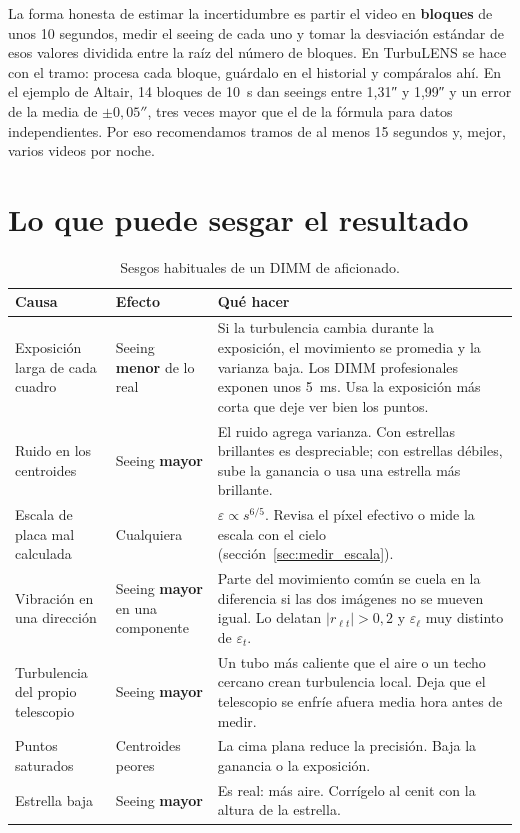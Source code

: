 La forma honesta de estimar la incertidumbre es partir el video en \textbf{bloques} de unos 10 segundos, medir el seeing
de cada uno y tomar la desviación estándar de esos valores dividida entre la raíz del número de bloques. En TurbuLENS se
hace con el tramo: procesa cada bloque, guárdalo en el historial y compáralos ahí. En el ejemplo de Altair, 14 bloques
de 10~s dan seeings entre 1,31″ y 1,99″ y un error de la media de $\pm0{,}05''$, tres veces mayor que el de la fórmula
para datos independientes. Por eso recomendamos tramos de al menos 15 segundos y, mejor, varios videos por noche.

\section{Lo que puede sesgar el resultado}\label{sec:sesgos}

\begin{table}[H]
\centering\small
\begin{tabularx}{\linewidth}{@{}>{\RaggedRight}p{3.6cm} >{\RaggedRight}p{2.4cm} Y@{}}
\toprule
Causa & Efecto & Qué hacer\\
\midrule
Exposición larga de cada cuadro & Seeing \textbf{menor} de lo real & Si la turbulencia cambia durante la exposición, el
movimiento se promedia y la varianza baja. Los DIMM profesionales exponen unos 5~ms. Usa la exposición más corta que deje
ver bien los puntos.\\
Ruido en los centroides & Seeing \textbf{mayor} & El ruido agrega varianza. Con estrellas brillantes es despreciable;
con estrellas débiles, sube la ganancia o usa una estrella más brillante.\\
Escala de placa mal calculada & Cualquiera & $\varepsilon \propto s^{6/5}$. Revisa el píxel efectivo o mide la escala
con el cielo (sección~\ref{sec:medir_escala}).\\
Vibración en una dirección & Seeing \textbf{mayor} en una componente & Parte del movimiento común se cuela en la
diferencia si las dos imágenes no se mueven igual. Lo delatan $|r_{\ell t}| > 0{,}2$ y $\varepsilon_\ell$ muy distinto
de $\varepsilon_t$.\\
Turbulencia del propio telescopio & Seeing \textbf{mayor} & Un tubo más caliente que el aire o un techo cercano crean
turbulencia local. Deja que el telescopio se enfríe afuera media hora antes de medir.\\
Puntos saturados & Centroides peores & La cima plana reduce la precisión. Baja la ganancia o la exposición.\\
Estrella baja & Seeing \textbf{mayor} & Es real: más aire. Corrígelo al cenit con la altura de la estrella.\\
\bottomrule
\end{tabularx}
\caption{Sesgos habituales de un DIMM de aficionado.}
\end{table}
